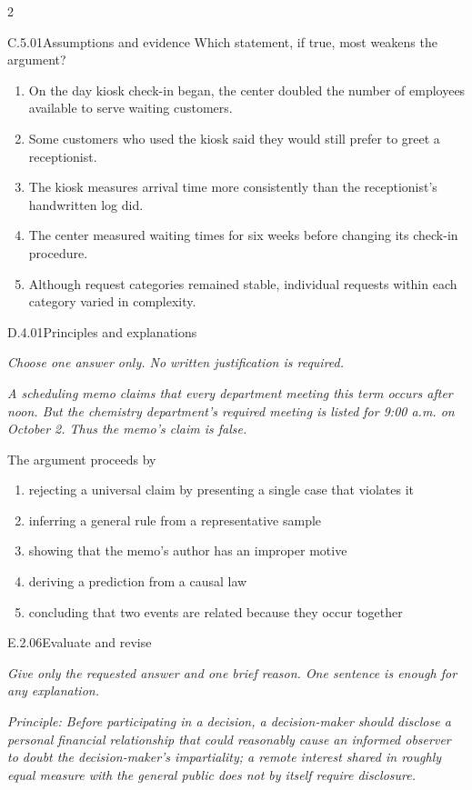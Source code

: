 \documentclass[9pt]{extarticle}
\newcommand{\choice}[1]{\item #1}
\begin{document}
\begin{multicols}{2}
\begin{DenseCoreProblem}{C.5.01}{Assumptions and evidence}
Which statement, if true, most weakens the argument?
\begin{enumerate}[label=(\alph*)]
  \choice{On the day kiosk check-in began, the center doubled the number of employees available to serve waiting customers.}
  \choice{Some customers who used the kiosk said they would still prefer to greet a receptionist.}
  \choice{The kiosk measures arrival time more consistently than the receptionist's handwritten log did.}
  \choice{The center measured waiting times for six weeks before changing its check-in procedure.}
  \choice{Although request categories remained stable, individual requests within each category varied in complexity.}
\end{enumerate}
\end{DenseCoreProblem}
\begin{DenseCoreProblem}{D.4.01}{Principles and explanations}
{\scriptsize\textit{Choose one answer only. No written justification is required.}\par}
\emph{A scheduling memo claims that every department meeting this term occurs after noon. But the chemistry department's required meeting is listed for 9:00 a.m. on October 2. Thus the memo's claim is false.}

The argument proceeds by
\begin{enumerate}[label=(\alph*)]
  \choice{rejecting a universal claim by presenting a single case that violates it}
  \choice{inferring a general rule from a representative sample}
  \choice{showing that the memo's author has an improper motive}
  \choice{deriving a prediction from a causal law}
  \choice{concluding that two events are related because they occur together}
\end{enumerate}
\end{DenseCoreProblem}
\begin{DenseCoreProblem}{E.2.06}{Evaluate and revise}
{\scriptsize\textit{Give only the requested answer and one brief reason. One sentence is enough for any explanation.}\par}
\emph{Principle: Before participating in a decision, a decision-maker should disclose a personal financial relationship that could reasonably cause an informed observer to doubt the decision-maker's impartiality; a remote interest shared in roughly equal measure with the general public does not by itself require disclosure.}


\end{DenseCoreProblem}
\end{multicols}
\end{document}
